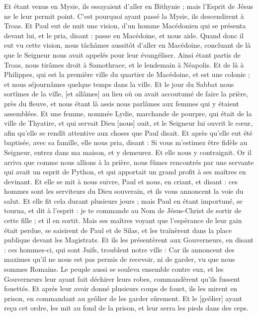 \begin{multicols}{2}
Et étant venus en Mysie, ils essayaient d'aller en Bithynie ; mais l'Esprit de Jésus ne le leur permit point.
C'est pourquoi ayant passé la Mysie, ils descendirent à Troas.
Et Paul eut de nuit une vision, d'un homme Macédonien qui se présenta devant lui, et le pria, disant : passe en Macédoine, et nous aide.
Quand donc il eut vu cette vision, nous tâchâmes aussitôt d'aller en Macédoine, concluant de là que le Seigneur nous avait appelés pour leur évangéliser.
Ainsi étant partis de Troas, nous tirâmes droit à Samothrace, et le lendemain à Néapolis.
Et de là à Philippes, qui est la première ville du quartier de Macédoine, et est une colonie ; et nous séjournâmes quelque temps dans la ville.
Et le jour du Sabbat nous sortîmes de la ville, [et allâmes] au lieu où on avait accoutumé de faire la prière, près du fleuve, et nous étant là assis nous parlâmes aux femmes qui y étaient assemblées.
Et une femme, nommée Lydie, marchande de pourpre, qui était de la ville de Thyatire, et qui servait Dieu [nous] ouit, et le Seigneur lui ouvrit le cœur, afin qu'elle se rendît attentive aux choses que Paul disait.
Et après qu'elle eut été baptisée, avec sa famille, elle nous pria, disant : Si vous m'estimez être fidèle au Seigneur, entrez dans ma maison, et y demeurez. Et elle nous y contraignit.
Or il arriva que comme nous allions à la prière, nous fûmes rencontrés par une servante qui avait un esprit de Python, et qui apportait un grand profit à ses maîtres en devinant.
Et elle se mit à nous suivre, Paul et nous, en criant, et disant : ces hommes sont les serviteurs du Dieu souverain, et ils vous annoncent la voie du salut.
Et elle fit cela durant plusieurs jours ; mais Paul en étant importuné, se tourna, et dit à l'esprit : je te commande au Nom de Jésus-Christ de sortir de cette fille ; et il en sortit.
Mais ses maîtres voyant que l'espérance de leur gain était perdue, se saisirent de Paul et de Silas, et les traînèrent dans la place publique devant les Magistrats.
Et ils les présentèrent aux Gouverneurs, en disant : ces hommes-ci, qui sont Juifs, troublent notre ville :
Car ils annoncent des maximes qu'il ne nous est pas permis de recevoir, ni de garder, vu que nous sommes Romains.
Le peuple aussi se souleva ensemble contre eux, et les Gouverneurs leur ayant fait déchirer leurs robes, commandèrent qu'ils fussent fouettés.
Et après leur avoir donné plusieurs coups de fouet, ils les mirent en prison, en commandant au geôlier de les garder sûrement.
Et le [geôlier] ayant reçu cet ordre, les mit au fond de la prison, et leur serra les pieds dans des ceps.

\end{multicols}
